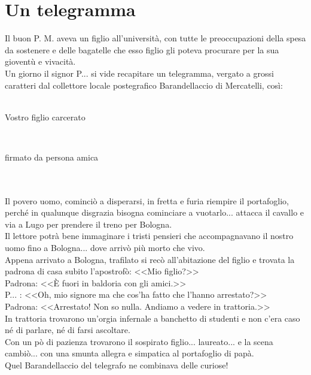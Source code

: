 
\chapter{Un telegramma}
Il buon P. M. aveva un figlio all'università, con tutte le preoccupazioni della spesa da sostenere e delle bagatelle che esso figlio gli poteva procurare per la sua gioventù e vivacità.\\
\indent Un giorno il signor P.\:.\:.\: si vide recapitare un telegramma, vergato a grossi caratteri dal collettore locale postegrafico Barandellaccio di Mercatelli, così:\\ \textcal \Huge\\
\centerline {Vostro figlio carcerato}\\
\centerline {firmato da persona amica}\\ \normalfont \normalsize \\
\indent Il povero uomo, cominciò a disperarsi, in fretta e furia riempire il portafoglio, perché in qualunque disgrazia bisogna cominciare a vuotarlo... attacca il cavallo e via a Lugo per prendere il treno per Bologna.\\
\indent Il lettore potrà bene immaginare i tristi pensieri che accompagnavano il nostro uomo fino a Bologna... dove arrivò più morto che vivo.\\
\indent Appena arrivato a Bologna, trafilato si recò all'abitazione del figlio e trovata la padrona di casa subito l'apostrofò: <<Mio figlio?>>\\
\indent Padrona: <<È fuori in baldoria con gli amici.>>\\
\indent {}P.\:.\:.\: : <<Oh, mio signore ma che cos'ha fatto che l'hanno arrestato?>>\\
\indent Padrona: <<Arrestato! Non so nulla. Andiamo a vedere in trattoria.>>\\
\indent In trattoria trovarono un'orgia infernale a banchetto di studenti e non c'era caso né di parlare, né di farsi ascoltare.\\
\indent Con un pò di pazienza trovarono il sospirato figlio... laureato... e la scena cambiò... con una smunta allegra e simpatica al portafoglio di papà.\\
\indent Quel Barandellaccio del telegrafo ne combinava delle curiose!

